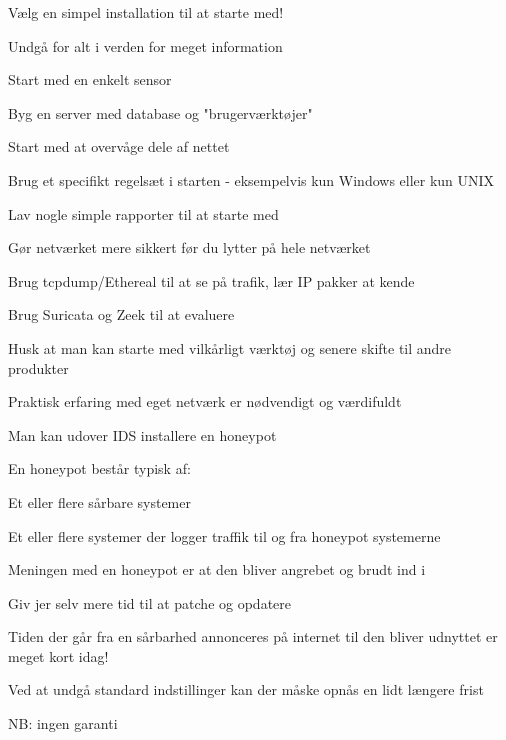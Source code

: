 \documentclass[Screen16to9,17pt]{foils}
\begin{document}

\begin{list1}
\item Vælg en simpel installation til at starte med!
\item Undgå for alt i verden for meget information
\begin{list2}
\item Start med en enkelt sensor
\item Byg en server med database og "brugerværktøjer"
\item Start med at overvåge dele af nettet
\item Brug et specifikt regelsæt i starten - eksempelvis kun Windows eller kun UNIX
\item Lav nogle simple rapporter til at starte med
\end{list2}
\item Gør netværket mere sikkert før du lytter på hele netværket
\item Brug tcpdump/Ethereal til at se på trafik, lær IP pakker at
  kende
\item Brug Suricata og Zeek til at evaluere
\begin{list2}
\item Husk at man kan starte med vilkårligt værktøj og senere skifte til andre
produkter
\item Praktisk erfaring med eget netværk er nødvendigt og værdifuldt
\end{list2}
\end{list1}


\begin{list1}
\item Man kan udover IDS installere en honeypot
\item En honeypot består typisk af:
  \begin{list2}
    \item Et eller flere sårbare systemer
\item Et eller flere systemer der logger traffik til og fra honeypot
  systemerne
  \end{list2}
\item Meningen med en honeypot er at den bliver angrebet og brudt ind
  i
\end{list1}


\begin{list1}
\item Giv jer selv mere tid til at patche og opdatere
\item Tiden der går fra en sårbarhed annonceres på internet til den bliver
       udnyttet er meget kort idag!
\item Ved at undgå standard indstillinger kan der
       måske opnås en lidt længere frist
\item NB: ingen garanti
\end{list1}
\end{document}
